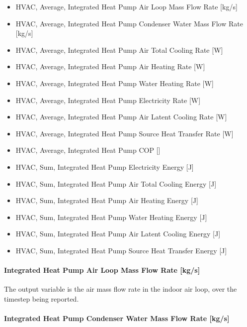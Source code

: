 \begin{itemize}
\item
  HVAC, Average, Integrated Heat Pump Air Loop Mass Flow Rate {[}kg/s{]}
\item
  HVAC, Average, Integrated Heat Pump Condenser Water Mass Flow Rate {[}kg/s{]}
\item
  HVAC, Average, Integrated Heat Pump Air Total Cooling Rate {[}W{]}
\item
  HVAC, Average, Integrated Heat Pump Air Heating Rate {[}W{]}
\item
  HVAC, Average, Integrated Heat Pump Water Heating Rate {[}W{]}
\item
  HVAC, Average, Integrated Heat Pump Electricity Rate {[}W{]}
\item
  HVAC, Average, Integrated Heat Pump Air Latent Cooling Rate {[}W{]}
\item
  HVAC, Average, Integrated Heat Pump Source Heat Transfer Rate {[}W{]}
 \item
  HVAC, Average, Integrated Heat Pump COP {[}{]}
 \item
  HVAC, Sum, Integrated Heat Pump Electricity Energy {[}J{]}
 \item
  HVAC, Sum, Integrated Heat Pump Air Total Cooling Energy {[}J{]}
  \item
  HVAC, Sum, Integrated Heat Pump Air Heating Energy {[}J{]}
\item
  HVAC, Sum, Integrated Heat Pump Water Heating Energy {[}J{]}
 \item
  HVAC, Sum, Integrated Heat Pump Air Latent Cooling Energy {[}J{]}
 \item
  HVAC, Sum, Integrated Heat Pump Source Heat Transfer Energy {[}J{]}

\end{itemize}

\paragraph{Integrated Heat Pump Air Loop Mass Flow Rate {[}kg/s{]}}\label{Out-Air-Loop-Flow-Rate-ASIHP}
The output variable is the air mass flow rate in the indoor air loop, over the timestep being reported.

\paragraph{Integrated Heat Pump Condenser Water Mass Flow Rate {[}kg/s{]}}\label{Out-Cond-water-Flow-ASIHP}


